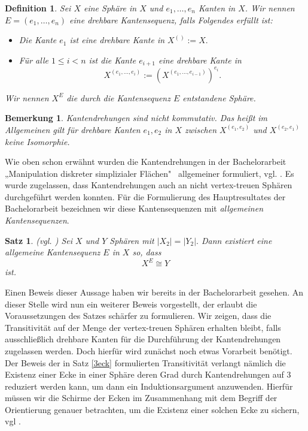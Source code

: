 \documentclass[12pt,titlepage,twoside,cleardoublepage]{article}
\theoremstyle{nummermitklammern}
\newtheorem{definition}[temp]{Definition}
\newtheorem{bemerkung}[temp]{Bemerkung}
\newtheorem{satz}[temp]{Satz}
\newtheorem{definition}[zahl]{Definition}
\newtheorem{bemerkung}[zahl]{Bemerkung}
\newtheorem{satz}[zahl]{Satz}
\numberwithin{equation}{section}
\begin{document}
\begin{definition}
Sei $X$ eine Sphäre in $X$ und $e_1,\ldots,e_n$ Kanten in $X$. Wir nennen $E=(e_1,\ldots,e_n)$ eine \emph{drehbare Kantensequenz}, falls Folgendes erfüllt ist: 
\begin{itemize}
\item Die Kante $e_1$ ist eine drehbare Kante in $X^{()}:=X.$ 
\item Für alle $1\leq i < n$ ist die Kante $e_{i+1}$ eine drehbare Kante in 
\[
X^{(e_1,\ldots,e_i)}:=(X^{(e_1,\ldots,e_{i-1})})^{e_i}.
\] 
\end{itemize}
Wir nennen $X^E$ die durch die Kantensequenz $E$ entstandene Sphäre. 
\end{definition}

\begin{bemerkung}
Kantendrehungen sind nicht kommutativ. Das heißt im Allgemeinen gilt für drehbare Kanten $e_1,e_2$ in $X$ zwischen $X^{(e_1,e_2)}$ und $X^{(e_2,e_1)}$ keine Isomorphie. 

\end{bemerkung}

Wie oben schon erwähnt wurden die Kantendrehungen in der Bachelorarbeit „Manipulation diskreter simplizialer Flächen"  \, 
 allgemeiner formuliert, vgl. \cite{Rey}. Es wurde zugelassen, dass Kantendrehungen auch an nicht vertex-treuen Sphären durchgeführt werden konnten. Für die Formulierung des Hauptresultates der Bachelorarbeit bezeichnen wir diese Kantensequenzen mit \emph{allgemeinen Kantensequenzen}.
\begin{satz}{(vgl. \textsc{\cite{Rey})}}
Sei $X$ und $Y$ Sphären mit $\vert X_2\vert=\vert Y_2\vert.$ Dann existiert eine allgemeine Kantensequenz $E$ in $X$ so, dass 
\[
X^E \cong Y
\]
ist. 
\end{satz}
Einen Beweis dieser Aussage haben wir bereits in der Bachelorarbeit gesehen. An dieser Stelle wird nun ein weiterer Beweis vorgestellt, der erlaubt die Voraussetzungen des Satzes schärfer zu formulieren. Wir zeigen, dass die Transitivität auf der Menge der vertex-treuen Sphären erhalten bleibt, falls ausschließlich drehbare Kanten für die Durchführung der Kantendrehungen zugelassen werden. Doch hierfür wird zunächst noch etwas Vorarbeit benötigt.\\ 
Der Beweis der in Satz \ref{3eck} formulierten Transitivität verlangt nämlich die Existenz einer Ecke in einer Sphäre deren Grad durch Kantendrehungen auf 3 reduziert werden kann, um dann ein Induktionsargument anzuwenden. Hierfür müssen wir die Schirme der Ecken im Zusammenhang mit dem Begriff der Orientierung genauer betrachten, um die Existenz einer solchen Ecke zu sichern, vgl \cite{simp}.
\end{document}
